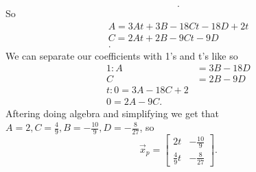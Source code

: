 \begin{eg}
\[  .\] So 
  \begin{align*}
    A=3At+3B-18Ct-18D+2t\\
    C=2At+2B-9Ct-9D\\
  .\end{align*}
  We can separate our coefficients with 1's and t's like so 
  \begin{align*}
    1:A&=3B-18D\\
    C&=2B-9D\\
    t: 0=3A-18C+2\\
    0=2A-9C
  .\end{align*} 
  Aftering doing algebra and simplifying we get that $A=2,C=\frac{4}{9},B=-\frac{10}{9},D=-\frac{8}{27}$, so \[
    \vec{x}_p=\begin{bmatrix} 2t&-\frac{10}{9}\\\frac{4}{9}t&-\frac{8}{27} \end{bmatrix} 
  .\] 
\end{eg}
